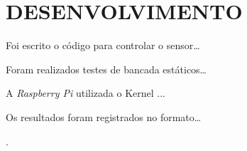 \chapter{DESENVOLVIMENTO}

Foi escrito o código para controlar o sensor\ldots

Foram realizados testes de bancada estáticos\ldots

A \emph{Raspberry Pi} utilizada o Kernel ...

Os resultados foram registrados no formato\ldots






























.














